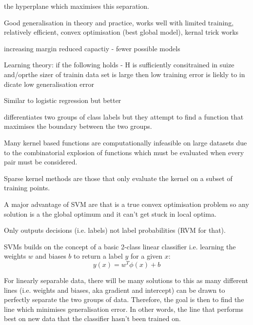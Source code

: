 the hyperplane which maximises this separation.  



Good generalisation in theory and practice, works well with limited training, relatively efficient, 
convex optimisation (best global model), kernal trick works

increasing margin reduced capactiy - fewer possible models

Learning theory: if the following holds - H is sufficiently consitrained in suize and/oprthe sizer of trainin data set is large
then low training error is liekly to in dicate low generalisation error

Similar to logistic regression but better



differentiates two groups of class labels but they attempt to find a function that maximises the boundary
between the two groups.




Many kernel based functions are computationally infeasible on large datasets due to the combinatorial explosion
of functions which must be evaluated when every pair must be considered.

Sparse kernel methods are those that only evaluate the kernel on a subset of training points.

A major advantage of SVM are that is a true convex optimisation problem so any solution is a the global
optimum and it can't get stuck in local optima.

Only outputs decisions (i.e. labels) not label probabilities (RVM for that).




SVMs builds on the concept of a basic 2-class linear classifier i.e. learning the weights \(w\) and biases \(b\)
to return a label \(y\) for a given \(x\):
\[
    y(x) = w^{T} \phi(x) + b
\]



For linearly separable data, there will be many solutions to this as many different lines (i.e. weights and biases, aka gradient and intercept) 
can be drawn to perfectly separate the two groups of data. Therefore, the goal is then to find the line which minimises generalisation error.
In other words, the line that performs best on new data that the classifier hasn't been trained on. 

